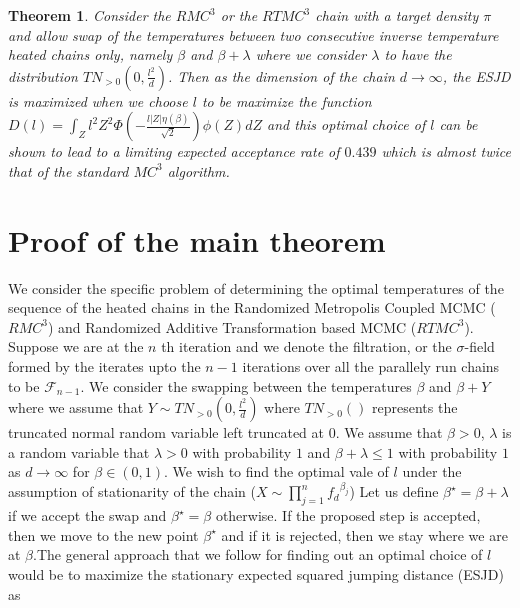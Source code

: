 \documentclass[11pt]{article}
\renewcommand{\b}{\ensuremath{\beta}}
\renewcommand{\l}{\lambda}
\newtheorem{theorem}{Theorem}
\begin{document}
\begin{theorem}
Consider the $RMC^3$ or the $RTMC^3$ chain with a target density $\pi$ and allow swap of the temperatures between two consecutive inverse temperature heated chains only, namely $\b$ and $\b+\l$ where we consider $\l$ to have the distribution $TN_{>0} (0, \frac{l^2}{d})$. Then as the dimension of the chain $d \rightarrow \infty$, the ESJD is maximized when we choose $l$ to be maximize the function 
$D(l)= \int_{Z} {l^2 Z^2 \Phi \left (-\frac{l|Z|\eta(\b)}{\sqrt{2}} \right ) \phi(Z)} dZ$
and this optimal choice of $l$ can be shown to lead to a limiting expected acceptance rate of $0.439$ which is almost twice that of the standard $MC^3$ algorithm. 
\end{theorem}


\section{Proof of the main theorem}

We consider the specific problem of determining the optimal temperatures of the sequence of the heated chains in the Randomized Metropolis Coupled MCMC ($RMC^3$) and Randomized Additive Transformation based MCMC ($RTMC^3$). Suppose we are at the $n$ th iteration and we denote the filtration, or the $\sigma$-field formed by the iterates upto the $n-1$ iterations over all the parallely run chains to be $\mathcal{F}_{n-1}$. We consider the swapping between the temperatures $\beta$ and $\beta+Y$ where we assume that $Y \sim TN_{>0}(0,\frac{l^2}{d})$ where $TN_{>0} ()$ represents the truncated normal random variable left truncated at $0$. We assume that $\beta > 0$, $\l$ is a random variable that $\l >0$ with probability $1$ and $\beta + \l \leq 1$ with probability $1$ as $d \rightarrow \infty$ for $\beta \in (0,1)$. We wish to find the optimal vale of $l$ under the assumption of stationarity of the chain ($X \sim \prod_{j=1}^{n} {f_{d}}^{\beta_j}$) Let us define $\beta^{\star}  =\beta+\l$ if we accept the swap and $\beta^{\star}=\beta$ otherwise. If the proposed step is accepted, then we move to the new point $\beta^{\star}$ and if it is rejected, then we stay where we are at $\beta$.The general approach that we follow for finding out an optimal choice of $l$ would be to maximize the stationary expected squared jumping distance (ESJD) as 

\end{document}
